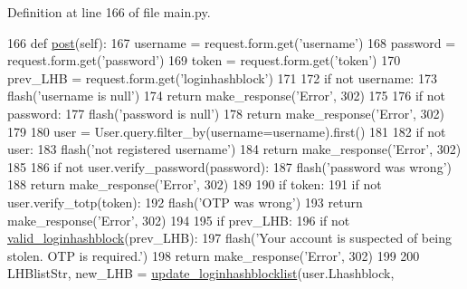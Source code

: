 Definition at line 166 of file main.\+py.


\begin{DoxyCode}
166     \textcolor{keyword}{def }\hyperlink{classmain_1_1login_a71ff3f89aaf0f0c8502577445ab38744}{post}(self):
167         username = request.form.get(\textcolor{stringliteral}{'username'})
168         password = request.form.get(\textcolor{stringliteral}{'password'})
169         token = request.form.get(\textcolor{stringliteral}{'token'})
170         prev\_LHB = request.form.get(\textcolor{stringliteral}{'loginhashblock'})
171 
172         \textcolor{keywordflow}{if} \textcolor{keywordflow}{not} username:
173             flash(\textcolor{stringliteral}{'username is null'})
174             \textcolor{keywordflow}{return} make\_response(\textcolor{stringliteral}{'Error'}, 302)
175 
176         \textcolor{keywordflow}{if} \textcolor{keywordflow}{not} password:
177             flash(\textcolor{stringliteral}{'password is null'})
178             \textcolor{keywordflow}{return} make\_response(\textcolor{stringliteral}{'Error'}, 302)
179 
180         user = User.query.filter\_by(username=username).first()
181 
182         \textcolor{keywordflow}{if} \textcolor{keywordflow}{not} user:
183             flash(\textcolor{stringliteral}{'not registered username'})
184             \textcolor{keywordflow}{return} make\_response(\textcolor{stringliteral}{'Error'}, 302)
185 
186         \textcolor{keywordflow}{if} \textcolor{keywordflow}{not} user.verify\_password(password):
187             flash(\textcolor{stringliteral}{'password was wrong'})
188             \textcolor{keywordflow}{return} make\_response(\textcolor{stringliteral}{'Error'}, 302)
189 
190         \textcolor{keywordflow}{if} token:
191             \textcolor{keywordflow}{if} \textcolor{keywordflow}{not} user.verify\_totp(token):
192                 flash(\textcolor{stringliteral}{'OTP was wrong'})
193                 \textcolor{keywordflow}{return} make\_response(\textcolor{stringliteral}{'Error'}, 302)
194 
195             \textcolor{keywordflow}{if} prev\_LHB:
196                 \textcolor{keywordflow}{if} \textcolor{keywordflow}{not} \hyperlink{namespaceloginhashblock_adb424539d851426da7b65d53c5a6d577}{valid\_loginhashblock}(prev\_LHB):
197                     flash(\textcolor{stringliteral}{'Your account is suspected of being stolen. OTP is required.'})
198                     \textcolor{keywordflow}{return} make\_response(\textcolor{stringliteral}{'Error'}, 302)
199 
200                 LHBlistStr, new\_LHB = \hyperlink{namespaceloginhashblock_a2bcc7ddd0fcc3788572dd77808cb624d}{update\_loginhashblocklist}(user.Lhashblock, 

\end{DoxyCode}
